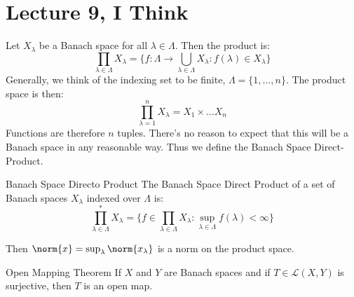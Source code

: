 \documentclass[crop=false,class=article,oneside]{standalone}
\begin{document}
    \section{Lecture 9, I Think}
        Let $X_{\lambda}$ be a Banach space for all
        $\lambda\in\Lambda$. Then the product is:
        \begin{equation}
            \prod_{\lambda\in\Lambda}X_{\lambda}
            =\{f:\Lambda\rightarrow\bigcup_{\lambda\in\Lambda}
            X_{\lambda}:f(\lambda)\in{X}_{\lambda}\}
        \end{equation}
        Generally, we think of the indexing set to be finite,
        $\Lambda=\{1,\dots,n\}$. The product space is then:
        \begin{equation}
            \prod_{\lambda=1}^{n}X_{\lambda}=
            X_{1}\times\dots{X}_{n}
        \end{equation}
        Functions are therefore $n$ tuples. There's no reason to
        expect that this will be a Banach space in any reasonable
        way. Thus we define the Banach Space Direct-Product.
        \begin{ldefinition}{Banach Space Directo Product}
            The Banach Space Direct Product of a set of Banach
            spaces $X_{\lambda}$ indexed over $\Lambda$ is:
            \begin{equation}
                \prod_{\lambda\in\Lambda}^{*}X_{\lambda}
                =\{f\in\prod_{\lambda\in\Lambda}X_{\lambda}:
                \underset{\lambda\in\Lambda}{\sup}
                f(\lambda)<\infty\}
            \end{equation}
        \end{ldefinition}
        Then $\norm{x}=\sup_{\lambda}\norm{x_{\lambda}}$ is a norm
        on the product space.
        \begin{ltheorem}{Open Mapping Theorem}
            If $X$ and $Y$ are Banach spaces and if
            $T\in\mathcal{L}(X,Y)$ is surjective, then $T$ is an
            open map.
        \end{ltheorem}
\end{document}
